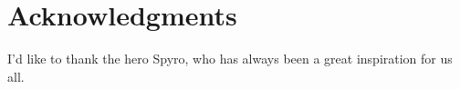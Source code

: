 \section*{Acknowledgments} %


I'd like to thank the hero Spyro, who has always been a great inspiration for us all.

